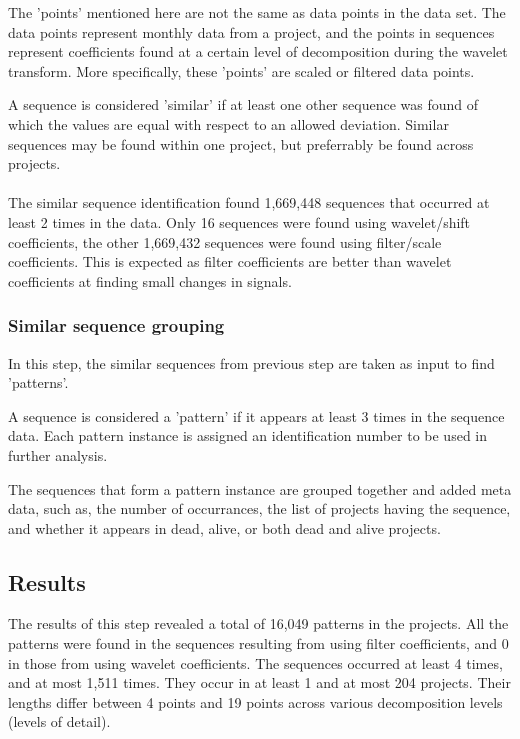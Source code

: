 The 'points' mentioned here are not the same as data points in the data set.
The data points represent monthly data from a project, and the points in
sequences represent coefficients found at a certain level of decomposition
during the wavelet transform. More specifically, these 'points' are scaled or
filtered data points.

A sequence is considered 'similar' if at least one other sequence was found of
which the values are equal with respect to an allowed deviation. Similar
sequences may be found within one project, but preferrably be found across
projects.

\paragraph{}
The similar sequence identification found 1,669,448 sequences that occurred
at least 2 times in the data. Only 16 sequences were found using wavelet/shift
coefficients, the other 1,669,432 sequences were found using filter/scale
coefficients. This is expected as filter coefficients are better than wavelet
coefficients at finding small changes in signals.

\subsubsection{Similar sequence grouping}
\label{def:pattern}
In this step, the similar sequences from previous step are taken as input to
find 'patterns'.

A sequence is considered a 'pattern' if it appears at least 3 times in the
sequence data. Each pattern instance is assigned an identification number to be
used in further analysis.

The sequences that form a pattern instance are grouped together and added meta
data, such as, the number of occurrances, the list of projects having the
sequence, and whether it appears in dead, alive, or both dead and alive
projects.

\subsection{Results}
The results of this step revealed a total of 16,049 patterns in the projects.
All the patterns were found in the sequences resulting from using filter
coefficients, and 0 in those from using wavelet coefficients. The sequences
occurred at least 4 times, and at most 1,511 times. They occur in at least 1
and at most 204 projects. Their lengths differ between 4 points and 19 points
across various decomposition levels (levels of detail).

